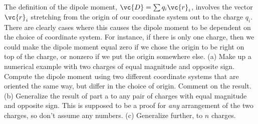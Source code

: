The definition of the dipole moment, $\vc{D}=\sum q_i \vc{r}_i$,
        involves the vector $\vc{r}_i$ stretching from the origin of our coordinate
        system out to the charge $q_i$. There are clearly cases where this
        causes the dipole moment to be dependent on the choice of coordinate
        system. For instance, if there is only one charge, then we could make
        the dipole moment equal zero if we chose the origin to be right on top
        of the charge, or nonzero if we put the origin somewhere else.\hwendpart
        (a) Make up a numerical example with two charges of equal magnitude
        and opposite sign. Compute the dipole moment using two different coordinate
        systems that are oriented the same way, but differ in the choice of origin.
        Comment on the result.\hwendpart
        (b) Generalize the result of part a to any pair of charges with equal
        magnitude and opposite sign. This is supposed to be a proof for \emph{any}
        arrangement of the two charges, so don't assume any numbers.\hwendpart
        (c) Generalize further, to $n$ charges.
